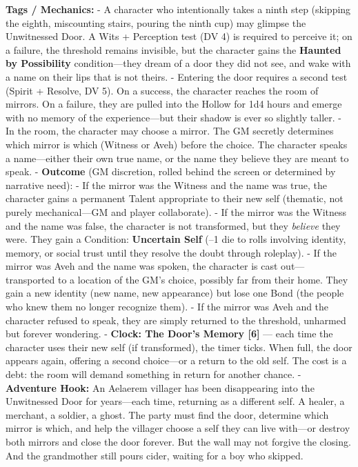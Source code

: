 \documentclass[12pt]{article}
\begin{document}
\textbf{Tags / Mechanics:}
- A character who intentionally takes a ninth step (skipping the eighth, miscounting stairs, pouring the ninth cup) may glimpse the Unwitnessed Door. A Wits + Perception test (DV 4) is required to perceive it; on a failure, the threshold remains invisible, but the character gains the \textbf{Haunted by Possibility} condition---they dream of a door they did not see, and wake with a name on their lips that is not theirs.
- Entering the door requires a second test (Spirit + Resolve, DV 5). On a success, the character reaches the room of mirrors. On a failure, they are pulled into the Hollow for 1d4 hours and emerge with no memory of the experience---but their shadow is ever so slightly taller.
- In the room, the character may choose a mirror. The GM secretly determines which mirror is which (Witness or Aveh) before the choice. The character speaks a name---either their own true name, or the name they believe they are meant to speak.
- \textbf{Outcome} (GM discretion, rolled behind the screen or determined by narrative need):
    - If the mirror was the Witness and the name was true, the character gains a permanent Talent appropriate to their new self (thematic, not purely mechanical---GM and player collaborate).
    - If the mirror was the Witness and the name was false, the character is not transformed, but they \textit{believe} they were. They gain a Condition: \textbf{Uncertain Self} (--1 die to rolls involving identity, memory, or social trust until they resolve the doubt through roleplay).
    - If the mirror was Aveh and the name was spoken, the character is cast out---transported to a location of the GM's choice, possibly far from their home. They gain a new identity (new name, new appearance) but lose one Bond (the people who knew them no longer recognize them).
    - If the mirror was Aveh and the character refused to speak, they are simply returned to the threshold, unharmed but forever wondering.
- \textbf{Clock: The Door's Memory [6]} --- each time the character uses their new self (if transformed), the timer ticks. When full, the door appears again, offering a second choice---or a return to the old self. The cost is a debt: the room will demand something in return for another chance.
- \textbf{Adventure Hook:} An Aelaerem villager has been disappearing into the Unwitnessed Door for years---each time, returning as a different self. A healer, a merchant, a soldier, a ghost. The party must find the door, determine which mirror is which, and help the villager choose a self they can live with---or destroy both mirrors and close the door forever. But the wall may not forgive the closing. And the grandmother still pours cider, waiting for a boy who skipped.
\end{document}
